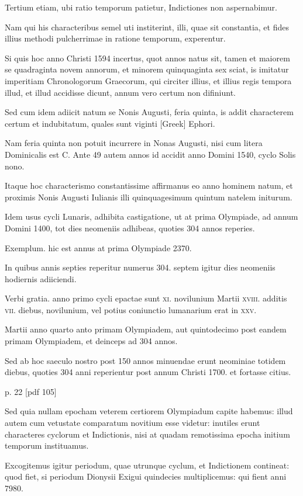 Tertium etiam,
ubi ratio temporum patietur, Indictiones non aspernabimur.

Nam
qui his characteribus semel uti institerint, illi, quae sit constantia, et fides
illius methodi pulcherrimae in ratione temporum, experentur.

Si
quis hoc anno Christi 1594 incertus, quot annos natus sit, tamen et
maiorem se quadraginta novem annorum, et minorem quinquaginta
sex sciat, is imitatur imperitiam Chronologorum Graecorum, qui
circiter illius, et illius regis tempora illud, et illud accidisse dicunt, annum
vero certum non difiniunt.

Sed cum idem adiicit natum se Nonis Augusti, feria quinta, is addit characterem certum et indubitatum, quales sunt viginti \textgreek{[Greek]} Ephori.

Nam feria quinta non
potuit incurrere in Nonas Augusti, nisi cum litera Dominicalis est C.
Ante 49 autem annos id accidit anno Domini 1540, cyclo Solis nono.

Itaque hoc characterismo constantissime affirmanus eo anno hominem
natum, et proximis Nonis Augusti Iulianis illi quinquagesimum
quintum natelem initurum.

Idem usus cycli Lunaris, adhibita
castigatione, ut at prima Olympiade, ad annum Domini 1400, tot
dies neomeniis adhibeas, quoties 304 annos reperies.

Exemplum. hic est annus at prima Olympiade 2370.

In quibus annis septies reperitur
numerus 304. septem igitur dies neomeniis hodiernis adiiciendi.

Verbi gratia. anno primo cycli epactae sunt \textsc{xi}. novilunium
Martii \textsc{xviii}. additis
 \textsc{vii}. diebus, novilunium, vel potius coniunctio
lumanarium erat in \textsc{xxv}.

Martii anno quarto anto primam Olympiadem,
aut quintodecimo post eandem primam Olympiadem, et deinceps
ad 304 annos.

Sed ab hoc saeculo nostro post 150 annos minuendae
erunt neominiae totidem diebus, quoties 304 anni reperientur
post annum Christi 1700. et fortasse citius.


p. 22 [pdf 105]

Sed quia nullam epocham
veterem certiorem Olympiadum capite habemus: illud autem
cum vetustate comparatum novitium esse videtur: inutiles erunt characteres
cyclorum et Indictionis, nisi at quadam remotissima epocha
initium temporum instituamus.

Excogitemus igitur periodum,
quae utrunque cyclum, et Indictionem contineat: quod fiet, si periodum
Dionysii Exigui quindecies multiplicemus: qui fient anni
7980.

